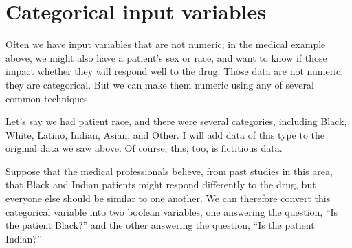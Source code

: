 \documentclass[letterpaper,10pt,english]{jupyterBook}
\begin{document}
\section{Categorical input variables}
\label{\detokenize{chapter-17-machine-learning:categorical-input-variables}}
\sphinxAtStartPar
Often we have input variables that are not numeric; in the medical example above, we might also have a patient’s sex or race, and want to know if those impact whether they will respond well to the drug.  Those data are not numeric; they are categorical.  But we can make them numeric using any of several common techniques.

\sphinxAtStartPar
Let’s say we had patient race, and there were several categories, including Black, White, Latino, Indian, Asian, and Other.  I will add data of this type to the original data we saw above.  Of course, this, too, is fictitious data.

\begin{sphinxVerbatim}[commandchars=\\\{\}]
\PYG{p}{[}\PYG{p}{]}  \PYG{p}{[}\PYG{p}{]}
\PYG{p}{[}\PYG{p}{]}  \PYG{p}{[}\PYG{p}{]}  
\end{sphinxVerbatim}

\sphinxAtStartPar
Suppose that the medical professionals believe, from past studies in this area, that Black and Indian patients might respond differently to the drug, but everyone else should be similar to one another.  We can therefore convert this categorical variable into two boolean variables, one answering the question, “Is the patient Black?” and the other answering the question, “Is the patient Indian?”
\end{document}
